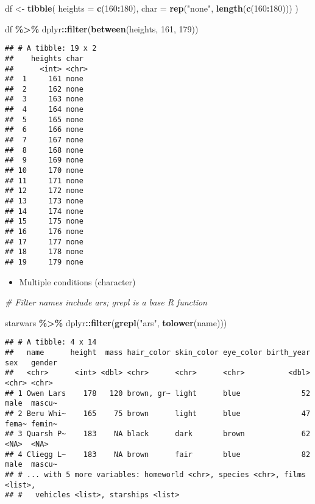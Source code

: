 \documentclass[
]{book}
\newenvironment{Shaded}{\begin{snugshade}}{\end{snugshade}}
\newcommand{\CommentTok}[1]{\textcolor[rgb]{0.56,0.35,0.01}{\textit{#1}}}
\newcommand{\DataTypeTok}[1]{\textcolor[rgb]{0.13,0.29,0.53}{#1}}
\newcommand{\DecValTok}[1]{\textcolor[rgb]{0.00,0.00,0.81}{#1}}
\newcommand{\KeywordTok}[1]{\textcolor[rgb]{0.13,0.29,0.53}{\textbf{#1}}}
\newcommand{\NormalTok}[1]{#1}
\newcommand{\OperatorTok}[1]{\textcolor[rgb]{0.81,0.36,0.00}{\textbf{#1}}}
\newcommand{\StringTok}[1]{\textcolor[rgb]{0.31,0.60,0.02}{#1}}
\providecommand{\tightlist}{%
  \setlength{\itemsep}{0pt}\setlength{\parskip}{0pt}}
\begin{document}
\begin{Shaded}
\begin{Highlighting}[]
\NormalTok{df \textless{}{-}}\StringTok{ }\KeywordTok{tibble}\NormalTok{(}
  \DataTypeTok{heights =} \KeywordTok{c}\NormalTok{(}\DecValTok{160}\OperatorTok{:}\DecValTok{180}\NormalTok{),}
  \DataTypeTok{char =} \KeywordTok{rep}\NormalTok{(}\StringTok{"none"}\NormalTok{, }\KeywordTok{length}\NormalTok{(}\KeywordTok{c}\NormalTok{(}\DecValTok{160}\OperatorTok{:}\DecValTok{180}\NormalTok{)))}
\NormalTok{)}

\NormalTok{df }\OperatorTok{\%\textgreater{}\%}
\StringTok{  }\NormalTok{dplyr}\OperatorTok{::}\KeywordTok{filter}\NormalTok{(}\KeywordTok{between}\NormalTok{(heights, }\DecValTok{161}\NormalTok{, }\DecValTok{179}\NormalTok{))}
\end{Highlighting}
\end{Shaded}

\begin{verbatim}
## # A tibble: 19 x 2
##    heights char 
##      <int> <chr>
##  1     161 none 
##  2     162 none 
##  3     163 none 
##  4     164 none 
##  5     165 none 
##  6     166 none 
##  7     167 none 
##  8     168 none 
##  9     169 none 
## 10     170 none 
## 11     171 none 
## 12     172 none 
## 13     173 none 
## 14     174 none 
## 15     175 none 
## 16     176 none 
## 17     177 none 
## 18     178 none 
## 19     179 none
\end{verbatim}

\begin{itemize}
\tightlist
\item
  Multiple conditions (character)
\end{itemize}

\begin{Shaded}
\begin{Highlighting}[]
\CommentTok{\# Filter names include ars; \textasciigrave{}grepl\textasciigrave{} is a base R function}

\NormalTok{starwars }\OperatorTok{\%\textgreater{}\%}
\StringTok{  }\NormalTok{dplyr}\OperatorTok{::}\KeywordTok{filter}\NormalTok{(}\KeywordTok{grepl}\NormalTok{(}\StringTok{"ars"}\NormalTok{, }\KeywordTok{tolower}\NormalTok{(name)))}
\end{Highlighting}
\end{Shaded}

\begin{verbatim}
## # A tibble: 4 x 14
##   name      height  mass hair_color skin_color eye_color birth_year sex   gender
##   <chr>      <int> <dbl> <chr>      <chr>      <chr>          <dbl> <chr> <chr> 
## 1 Owen Lars    178   120 brown, gr~ light      blue              52 male  mascu~
## 2 Beru Whi~    165    75 brown      light      blue              47 fema~ femin~
## 3 Quarsh P~    183    NA black      dark       brown             62 <NA>  <NA>  
## 4 Cliegg L~    183    NA brown      fair       blue              82 male  mascu~
## # ... with 5 more variables: homeworld <chr>, species <chr>, films <list>,
## #   vehicles <list>, starships <list>
\end{verbatim}
\end{document}
